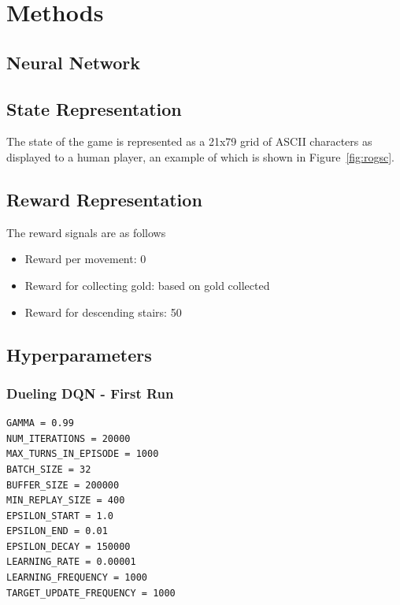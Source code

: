 \documentclass[12pt,a4paper]{article}
\begin{document}
    \section{Methods}\label{sec:methods}

    \subsection{Neural Network}\label{subsec:neural-network2}

    \subsection{State Representation}\label{subsec:state-representation}
    The state of the game is represented as a 21x79 grid of ASCII characters as displayed to a human player, an example
    of which is shown in Figure~\ref{fig:rogsc}.

    \subsection{Reward Representation}\label{subsec:reward-representation}
    The reward signals are as follows
    \begin{itemize}
        \item Reward per movement: 0
        \item Reward for collecting gold: based on gold collected
        \item Reward for descending stairs: 50
    \end{itemize}

    \subsection{Hyperparameters}\label{subsec:hyperparameters}
    \subsubsection{Dueling DQN - First Run}
    \begin{lstlisting}[label={lst:ddqn1hyperparameters}]
GAMMA = 0.99
NUM_ITERATIONS = 20000
MAX_TURNS_IN_EPISODE = 1000
BATCH_SIZE = 32
BUFFER_SIZE = 200000
MIN_REPLAY_SIZE = 400
EPSILON_START = 1.0
EPSILON_END = 0.01
EPSILON_DECAY = 150000
LEARNING_RATE = 0.00001
LEARNING_FREQUENCY = 1000
TARGET_UPDATE_FREQUENCY = 1000
    \end{lstlisting}
\end{document}
